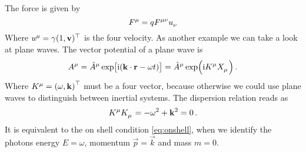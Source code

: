 The  force is given by
\begin{equation}
    \tensor{F}{^\mu}=q\tensor{F}{^\mu^\nu}\tensor{u}{_\nu}
\end{equation}
Where $\tensor{u}{^\mu}=\gamma(1,\vec{v})\transpose$ is the four velocity. As
another example we can take a look at plane waves. The vector potential of a plane wave is
\begin{equation}
    \tensor{A}{^\mu}=\tensor{\hat{A}}{^\mu}
    \exp\left[\imI(\vec{k}\cdot\vec{r}-\omega
    t)\right]
    =\tensor{\hat{A}}{^\mu}\exp\left(\imI\tensor{K}{^\mu} \tensor{X}{_\mu}\right)\,
    .
\end{equation}
Where $\tensor{K}{^\mu}=\left(\omega,\vec{k}\right)\transpose$ must be a four
vector, because otherwise we could use plane waves to distinguish between
inertial systems. The dispersion relation reads as
\begin{equation}
    \tensor{K}{^\mu}\tensor{K}{_\mu}=-\omega^2+\vec{k}^2=0\, .
\end{equation}
It is equivalent to the on shell condition \eqref{eq:onshell}, when we identify
the photons energy $E=\omega$, momentum $\vec{p}=\vec{k}$ and mass $m=0$.
